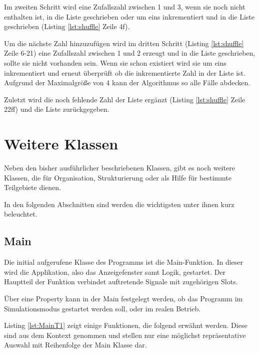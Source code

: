 Im zweiten Schritt wird eine Zufallszahl zwischen 1 und 3, wenn sie noch nicht enthalten ist, in die Liste geschrieben oder um eins inkrementiert und in die Liste geschrieben (Listing \ref{lst:shuffle} Zeile 4f). 

Um die nächste Zahl hinzuzufügen wird im dritten Schritt (Listing \ref{lst:shuffle} Zeile 6-21) eine Zufallszahl zwischen 1 und 2 erzeugt und in die Liste geschrieben, sollte sie nicht vorhanden sein. Wenn sie schon existiert wird sie um eins inkrementiert und erneut überprüft ob die inkrementierte Zahl in der Liste ist. Aufgrund der Maximalgröße von 4 kann der Algorithmus so alle Fälle abdecken.
 
Zuletzt wird die noch fehlende Zahl der Liste ergänzt (Listing \ref{lst:shuffle} Zeile 22ff) und die Liste zurückgegeben. 

\section{Weitere Klassen}

Neben den bisher ausführlicher beschriebenen Klassen, gibt es noch weitere Klassen, die für Organisation, Strukturierung oder als Hilfe für bestimmte Teilgebiete dienen. 

In den folgenden Abschnitten sind werden die wichtigsten unter ihnen kurz beleuchtet.

\subsection{Main}
\label{sec:Main}

Die initial aufgerufene Klasse des Programms ist die Main-Funktion. In dieser wird die Applikation, also das Anzeigefenster samt Logik, gestartet. Der Hauptteil der Funktion verbindet auftretende Signale mit zugehörigen Slots. 

Über eine Property kann in der Main festgelegt werden, ob das Programm im Simulationsmodus gestartet werden soll, oder im realen Betrieb. 

Listing \ref{lst:MainT1} zeigt einige Funktionen, die folgend erwähnt werden. Diese sind aus dem Kontext genommen und stellen nur eine möglichst repräsentative Auswahl mit Reihenfolge der Main Klasse dar. 

